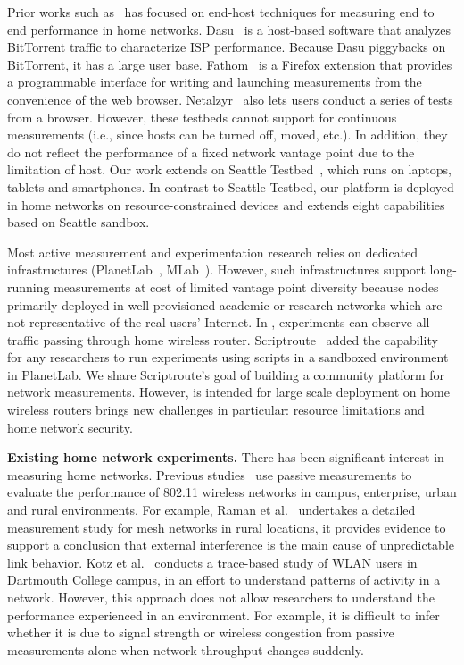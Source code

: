 Prior works such as~\cite{sanchez2014measurement,dhawan2012fathom,kreibich2010netalyzr} has focused on end-host techniques for measuring end to end performance in home networks. Dasu~\cite{sanchez2014measurement} is a host-based software that analyzes BitTorrent traffic to characterize ISP performance. Because Dasu piggybacks on BitTorrent, it has a large user base. Fathom~\cite{dhawan2012fathom} is a Firefox extension that provides a programmable interface for writing and launching measurements from the convenience of the web browser. Netalzyr~\cite{kreibich2010netalyzr} also lets users conduct a series of tests from a browser. However, these testbeds cannot support for continuous measurements (i.e., since hosts can be turned off, moved, etc.). In addition, they do not reflect the performance of a fixed network vantage point due to the limitation of host. Our work extends on Seattle Testbed~\cite{cappos2009seattle}, which runs on laptops, tablets and smartphones. In contrast to Seattle Testbed, our platform is deployed in home networks on resource-constrained devices and extends eight capabilities based on Seattle sandbox.

Most active measurement and experimentation research relies on dedicated infrastructures (PlanetLab~\cite{chun2003planetlab}, MLab~\cite{mlab}). However, such infrastructures support long-running measurements at cost of limited vantage point diversity because nodes primarily deployed in well-provisioned academic or research networks which are not representative of the real users' Internet. In \sysname, experiments can observe all traffic passing through home wireless router. Scriptroute~\cite{spring2003scriptroute} added the capability for any researchers to run experiments using scripts in a sandboxed environment in PlanetLab. We share Scriptroute's goal of building a community platform for network measurements. However, \sysname is intended for large scale deployment on home wireless routers brings new challenges in particular: resource limitations and home network security.

\textbf{Existing home network experiments.} There has been significant interest in measuring home networks. Previous studies~\cite{aguayo2004link,kotz2005analysis,raman2009feasibility} use passive measurements to evaluate the performance of 802.11 wireless networks in campus, enterprise, urban and rural environments. For example, Raman et al.~\cite{raman2009feasibility} undertakes a detailed measurement study for mesh networks in rural locations, it provides evidence to support a conclusion that external interference is the main cause of unpredictable link behavior. Kotz et al.~\cite{kotz2005analysis} conducts a trace-based study of WLAN users in Dartmouth College campus, in an effort to understand patterns of activity in a network. However, this approach does not allow researchers to understand the performance experienced in an environment. For example, it is difficult to infer whether it is due to signal strength or wireless congestion from passive measurements alone when network throughput changes suddenly.


